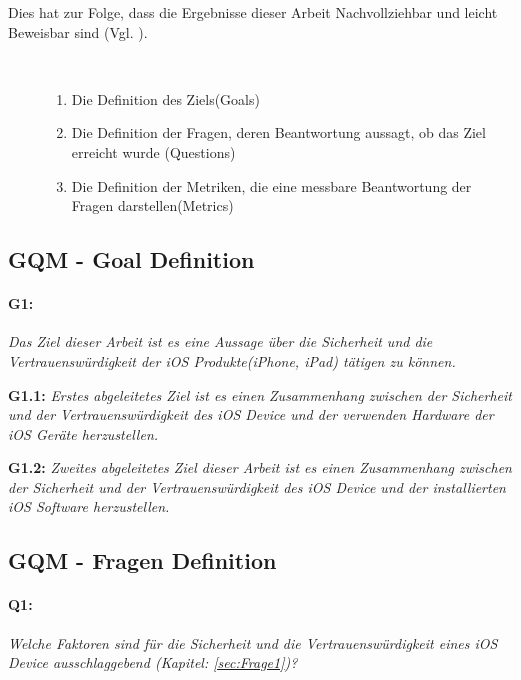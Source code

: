  Dies hat zur Folge, dass die Ergebnisse dieser Arbeit Nachvollziehbar und leicht Beweisbar sind (Vgl. \cite{GQM[3], GQM[4]}).
\begin{description}
    \item[\parbox{\textwidth} {Die GQM-Methode ist in drei Schritte unterteilt und dient zur Bewertung der erhoben Daten}]~\par
    \begin{enumerate}
        \item Die Definition des Ziels(Goals)
        \item Die Definition der Fragen, deren Beantwortung aussagt, ob das Ziel erreicht wurde (Questions)
        \item Die Definition der Metriken, die eine messbare Beantwortung der Fragen darstellen(Metrics)
    \end{enumerate}
\end{description} 

\subsection{GQM - Goal Definition}
\label{sec:GQMGoal}

\paragraph{G1:} \textit{\glqq Das Ziel dieser Arbeit ist es eine Aussage über die Sicherheit und die Vertrauenswürdigkeit der iOS Produkte(iPhone, iPad) tätigen zu können.\grqq{}} \par 
\textbf{G1.1:} \textit{\glqq Erstes abgeleitetes Ziel ist es einen Zusammenhang zwischen der Sicherheit und der Vertrauenswürdigkeit des iOS Device und der verwenden Hardware der iOS Geräte herzustellen.\grqq{}} \par 
\textbf{G1.2:} \textit{\glqq Zweites abgeleitetes Ziel dieser Arbeit ist es einen Zusammenhang zwischen der Sicherheit und der Vertrauenswürdigkeit des iOS Device und der installierten iOS Software herzustellen.\grqq{}}

\subsection{GQM - Fragen Definition}
\label{sec:GQMFragen}

\paragraph{Q1:} \textit{\glqq Welche Faktoren sind für die Sicherheit und die Vertrauenswürdigkeit eines iOS Device ausschlaggebend (Kapitel: \ref{sec:Frage1})?\grqq{}}
                    
